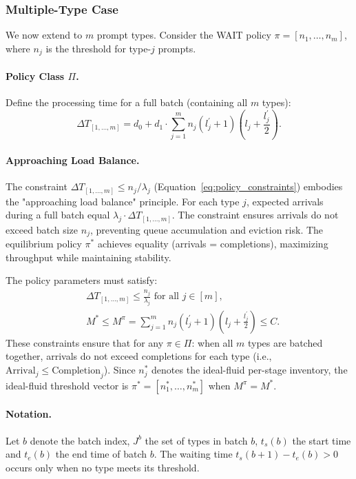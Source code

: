 \subsubsection{Multiple-Type Case}

We now extend to $m$ prompt types. Consider the WAIT policy $\pi = [n_1,\ldots,n_m]$, where $n_j$ is the threshold for type-$j$ prompts.

\paragraph{Policy Class $\Pi$.} Define the processing time for a full batch (containing all $m$ types):
\begin{equation}\label{eq:batch_time_def}
\Delta T_{[1,\ldots,m]} =  d_0 + d_1 \cdot \sum_{j=1}^m n_j(l_j^\prime+1)\left( l_j+\frac{l_j^\prime}{2} \right).
\end{equation}

\paragraph{Approaching Load Balance.}
The constraint $\Delta T_{[1,\ldots,m]} \leq n_j/\lambda_j$ (Equation~\ref{eq:policy_constraints}) embodies the "approaching load balance" principle. For each type $j$, expected arrivals during a full batch equal $\lambda_j \cdot \Delta T_{[1,\ldots,m]}$. The constraint ensures arrivals do not exceed batch size $n_j$, preventing queue accumulation and eviction risk. The equilibrium policy $\pi^*$ achieves equality (arrivals = completions), maximizing throughput while maintaining stability.

The policy parameters must satisfy:
\begin{equation}\label{eq:policy_constraints}
\begin{aligned}
&\Delta T_{[1,\ldots,m]} \leq \frac{n_j}{\lambda_j} \text{ for all } j \in [m], \\
&M^{*}\leq M^{\pi} = \sum_{j=1}^mn_j(l_j^\prime+1)\left(l_j+\frac{l_j^\prime}{2}\right)\leq C.
\end{aligned}
\end{equation}
These constraints ensure that for any $\pi \in \Pi$: when all $m$ types are batched together, arrivals do not exceed completions for each type (i.e., $\text{Arrival}_j\leq \text{Completion}_j$). Since \(n_j^*\) denotes the ideal-fluid per-stage inventory, the ideal-fluid threshold vector is \(\pi^* = [n_1^*,\ldots,n_m^*]\) when \(M^\pi = M^*\).

\paragraph{Notation.} Let $b$ denote the batch index, $J^b$ the set of types in batch $b$, $t_s(b)$ the start time and $t_e(b)$ the end time of batch $b$. The waiting time $t_s(b+1)-t_e(b)>0$ occurs only when no type meets its threshold.

